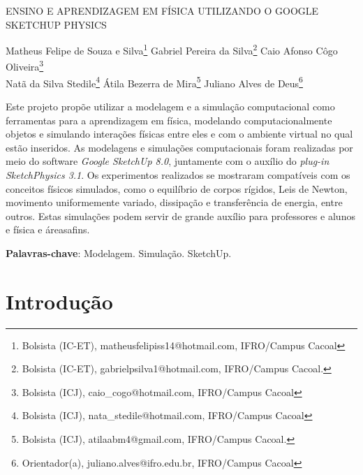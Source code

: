 \documentclass[article,12pt,onesidea,4paper,english,brazil]{abntex2}
\begin{document}
	
	
	\frenchspacing 
	
	\begin{center}
		\LARGE ENSINO E APRENDIZAGEM EM FÍSICA UTILIZANDO O GOOGLE SKETCHUP PHYSICS 
		
		\normalsize
		Matheus Felipe de Souza e Silva\footnote{Bolsista (IC-ET), matheusfelipiss14@hotmail.com, IFRO/Campus Cacoal} 
		Gabriel Pereira da Silva\footnote{Bolsista (IC-ET), gabrielpsilva1@hotmail.com, IFRO/Campus Cacoal.} 
		Caio Afonso Côgo Oliveira\footnote{Bolsista (ICJ), caio\_cogo@hotmail.com, IFRO/Campus Cacoal} \\
	Natã da Silva Stedile\footnote{Bolsista (ICJ), nata\_stedile@hotmail.com, IFRO/Campus Cacoal} 
	Átila Bezerra de Mira\footnote{Bolsista (ICJ), atilaabm4@gmail.com, IFRO/Campus Cacoal.}
	Juliano Alves de Deus\footnote{Orientador(a), juliano.alves@ifro.edu.br, IFRO/Campus Cacoal}
	\end{center}
	
	\begin{resumoumacoluna}
		Este projeto propõe utilizar a modelagem e a simulação computacional como ferramentas para a aprendizagem em física, modelando computacionalmente objetos e simulando interações físicas entre eles e com o ambiente virtual no qual estão inseridos. As modelagens e simulações computacionais foram realizadas por meio do software\textit{ Google SketchUp 8.0}, juntamente com o auxílio do\textit{ plug-in SketchPhysics 3.1}. Os experimentos realizados se mostraram compatíveis com os conceitos físicos simulados, como o equilíbrio de corpos rígidos, Leis de Newton, movimento uniformemente variado, dissipação e transferência de energia, entre outros. Estas simulações podem servir de grande auxílio para professores e alunos  e física e áreasafins.
		
		\vspace{\onelineskip}
		
		\noindent
		\textbf{Palavras-chave}: Modelagem. Simulação. SketchUp.
	\end{resumoumacoluna}
	
	\section*{Introdução}
	
\end{document}
